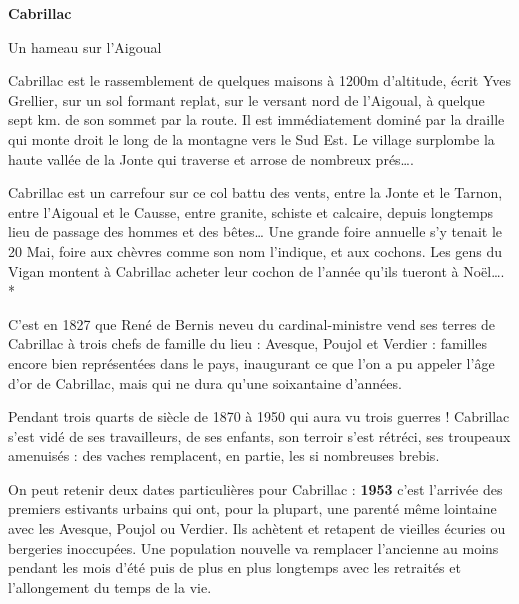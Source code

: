 
\begin{center}
    {\Large\bfseries Cabrillac}

    \vspace{0.15cm}

    {\large Un hameau sur l’Aigoual}
\end{center}

\vspace{0.45cm}

Cabrillac est le rassemblement de quelques maisons à 1200m d’altitude, écrit Yves Grellier,
sur un sol formant replat, sur le versant nord de l’Aigoual, à quelque sept km. de son sommet
par la route. Il est immédiatement dominé par la draille qui monte droit le long de la
montagne vers le Sud Est. Le village surplombe la haute vallée de la Jonte qui traverse et
arrose de nombreux prés….

\vspace{0.3cm}

Cabrillac est un carrefour sur ce col battu des vents, entre la Jonte et le Tarnon, entre
l’Aigoual et le Causse, entre granite, schiste et calcaire, depuis longtemps lieu de passage des
hommes et des bêtes… Une grande foire annuelle s’y tenait le 20 Mai, foire aux chèvres
comme son nom l’indique, et aux cochons. Les gens du Vigan montent à Cabrillac acheter
leur cochon de l’année qu’ils tueront à Noël…. *

\vspace{0.3cm}

C’est en 1827 que René de Bernis neveu du cardinal-ministre vend ses terres de Cabrillac à
trois chefs de famille du lieu : Avesque, Poujol et Verdier : familles encore bien représentées
dans le pays, inaugurant ce que l’on a pu appeler l’âge d’or de Cabrillac, mais qui ne dura
qu’une soixantaine d’années.

Pendant trois quarts de siècle de 1870 à 1950 qui aura vu trois guerres ! Cabrillac s’est vidé de
ses travailleurs, de ses enfants, son terroir s’est rétréci, ses troupeaux amenuisés : des vaches
remplacent, en partie, les si nombreuses brebis.

\vspace{0.3cm}

On peut retenir deux dates particulières pour Cabrillac : \textbf{1953} c’est l’arrivée des premiers
estivants urbains qui ont, pour la plupart, une parenté même lointaine avec les Avesque,
Poujol ou Verdier. Ils achètent et retapent de vieilles écuries ou bergeries inoccupées. Une
population nouvelle va remplacer l’ancienne au moins pendant les mois d’été puis de plus en
plus longtemps avec les retraités et l’allongement du temps de la vie.

